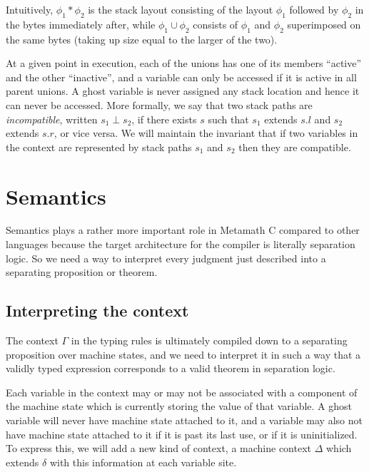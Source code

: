 \documentclass[acmsmall,nonacm]{acmart}
\begin{document}
Intuitively, $\phi_1\ast\phi_2$ is the stack layout consisting of the layout $\phi_1$ followed by $\phi_2$ in the bytes immediately after, while $\phi_1\cup\phi_2$ consists of $\phi_1$ and $\phi_2$ superimposed on the same bytes (taking up size equal to the larger of the two).

At a given point in execution, each of the unions has one of its members ``active'' and the other ``inactive'', and a variable can only be accessed if it is active in all parent unions.
A ghost variable is never assigned any stack location and hence it can never be accessed. More formally, we say that two stack paths are \emph{incompatible}, written $s_1\perp s_2$, if there exists $s$ such that $s_1$ extends $s.l$ and $s_2$ extends $s.r$, or vice versa. We will maintain the invariant that if two variables in the context are represented by stack paths $s_1$ and $s_2$ then they are compatible.

\section{Semantics}

Semantics plays a rather more important role in Metamath C compared to other languages because the target architecture for the compiler is literally separation logic. So we need a way to interpret every judgment just described into a separating proposition or theorem.

\subsection{Interpreting the context}

The context $\Gamma$ in the typing rules is ultimately compiled down to a separating proposition over machine states, and we need to interpret it in such a way that a validly typed expression corresponds to a valid theorem in separation logic.

Each variable in the context may or may not be associated with a component of the machine state which is currently storing the value of that variable. A ghost variable will never have machine state attached to it, and a variable may also not have machine state attached to it if it is past its last use, or if it is uninitialized. To express this, we will add a new kind of context, a machine context $\Delta$ which extends $\delta$ with this information at each variable site.
\end{document}
